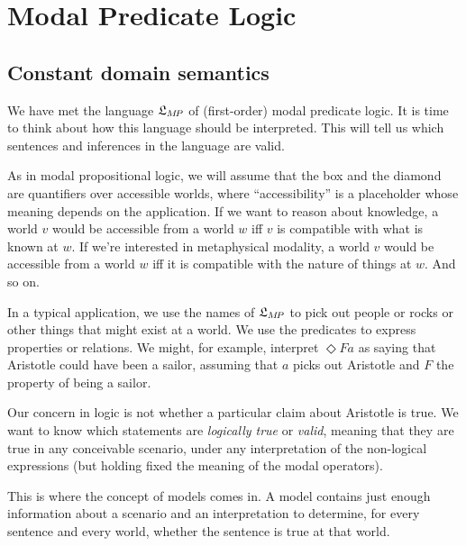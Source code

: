 \chapter{Modal Predicate Logic}\label{ch:qml2}

\section{Constant domain semantics}\label{sec:constantdomainsemantics}

We have met the language $\mathfrak{L}_{M\!P}$ of (first-order) modal predicate logic. It
is time to think about how this language should be interpreted. This will tell
us which sentences and inferences in the language are valid.

As in modal propositional logic, we will assume that the box and the diamond are
quantifiers over accessible worlds, where ``accessibility'' is a placeholder
whose meaning depends on the application. If we want to reason about knowledge,
a world $v$ would be accessible from a world $w$ iff $v$ is compatible with what
is known at $w$. If we're interested in metaphysical modality, a world $v$
would be accessible from a world $w$ iff it is compatible with the nature of
things at $w$. And so on.

In a typical application, we use the names of $\mathfrak{L}_{M\!P}$ to pick out people or
rocks or other things that might exist at a world. We use the predicates to
express properties or relations. We might, for example, interpret $\Diamond Fa$
as saying that Aristotle could have been a sailor, assuming that $a$ picks out
Aristotle and $F$ the property of being a sailor.

Our concern in logic is not whether a particular claim about Aristotle is true. We
want to know which statements are \emph{logically true} or \emph{valid}, meaning
that they are true in any conceivable scenario, under any interpretation of the
non-logical expressions (but holding fixed the meaning of the modal operators).

This is where the concept of models comes in. A model contains just enough
information about a scenario and an interpretation to determine, for every
sentence and every world, whether the sentence is true at that world.

